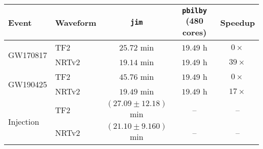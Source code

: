 \begin{tabular}{l l c c c}
 Event & Waveform & \texttt{jim} & \texttt{pbilby} (480 cores) & Speedup \\
 \hline\hline
\multirow{2}{*}{GW170817} & TF2 & $25.72$ min & $19.49$ h & $0 \times $ \\
 & NRTv2 & $19.14$ min & $19.49$ h & $39 \times $ \\ \hline
\multirow{2}{*}{GW190425}  & TF2 & $45.76$ min & $19.49$ h & $0 \times $ \\ 
 & NRTv2 & $19.49$ min & $19.49$ h & $17 \times $ \\ \hline
\multirow{2}{*}{Injection} & TF2 & $(27.09 \pm 12.18)$ min & -- & -- \\
& NRTv2 & $(21.10 \pm 9.160)$ min & -- & -- \\
\hline\hline
\end{tabular}